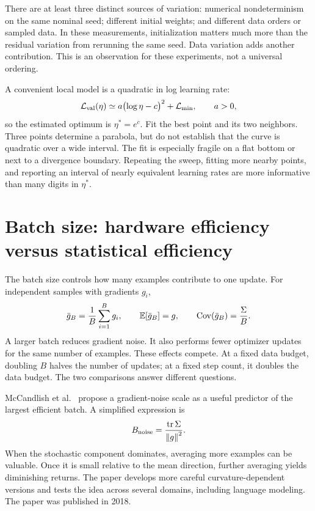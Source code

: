 There are at least three distinct sources of variation: numerical nondeterminism on the same nominal seed; different initial weights; and different data orders or sampled data. In these measurements, initialization matters much more than the residual variation from rerunning the same seed. Data variation adds another contribution. This is an observation for these experiments, not a universal ordering.

A convenient local model is a quadratic in log learning rate:
\begin{equation}
\mathcal L_{\rm val}(\eta)\simeq a\bigl(\log\eta-c\bigr)^2+\mathcal L_{\min},\qquad a>0,
\label{eq:lr-quadratic}
\end{equation}
so the estimated optimum is $\eta^*=e^c$. Fit the best point and its two neighbors. Three points determine a parabola, but do not establish that the curve is quadratic over a wide interval. The fit is especially fragile on a flat bottom or next to a divergence boundary. Repeating the sweep, fitting more nearby points, and reporting an interval of nearly equivalent learning rates are more informative than many digits in $\eta^*$.

\section{Batch size: hardware efficiency versus statistical efficiency}
The batch size controls how many examples contribute to one update. For independent samples with gradients $g_i$,
\[
\bar g_B=\frac1B\sum_{i=1}^{B}g_i,
\qquad \mathbb E[\bar g_B]=g,
\qquad \operatorname{Cov}(\bar g_B)=\frac{\Sigma}{B}.
\]
A larger batch reduces gradient noise. It also performs fewer optimizer updates for the same number of examples. These effects compete. At a fixed data budget, doubling $B$ halves the number of updates; at a fixed step count, it doubles the data budget. The two comparisons answer different questions.

McCandlish et al.~\cite{largebatch} propose a gradient-noise scale as a useful predictor of the largest efficient batch. A simplified expression is
\begin{equation}
 B_{\rm noise}=\frac{\operatorname{tr}\Sigma}{\left\lVert g\right\rVert^2}.
\end{equation}
When the stochastic component dominates, averaging more examples can be valuable. Once it is small relative to the mean direction, further averaging yields diminishing returns. The paper develops more careful curvature-dependent versions and tests the idea across several domains, including language modeling. The paper was published in 2018.

